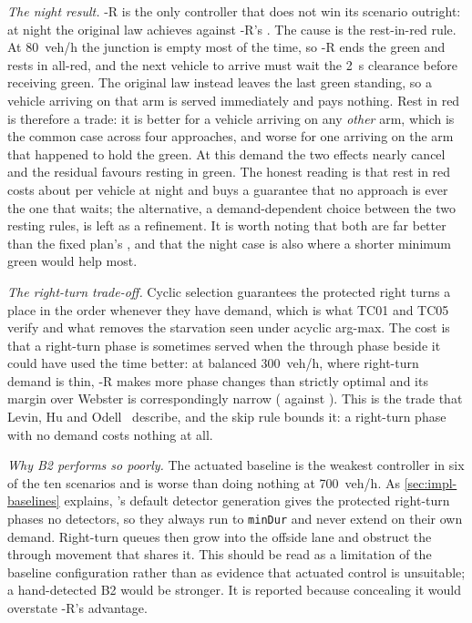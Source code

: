\textit{The night result.} \prism{}-R is the only controller that does not win its scenario outright: at
night the original law achieves  against \prism{}-R's . The cause is the rest-in-red
rule. At 80~veh/h the junction is empty most of the time, so \prism{}-R ends the green and rests in all-red,
and the next vehicle to arrive must wait the 2~s clearance before receiving green. The original law instead
leaves the last green standing, so a vehicle arriving on that arm is served immediately and pays nothing.
Rest in red is therefore a trade: it is better for a vehicle arriving on any \emph{other} arm, which is the
common case across four approaches, and worse for one arriving on the arm that happened to hold the green.
At this demand the two effects nearly cancel and the residual favours resting in green. The honest reading is
that rest in red costs about  per vehicle at night and buys a guarantee that no approach is ever
the one that waits; the alternative, a demand-dependent choice between the two resting rules, is left as a
refinement. It is worth noting that both are far better than the fixed plan's , and that the
night case is also where a shorter minimum green would help most.

\textit{The right-turn trade-off.} Cyclic selection guarantees the protected right turns a place in the
order whenever they have demand, which is what TC01 and TC05 verify and what removes the starvation seen
under acyclic arg-max. The cost is that a right-turn phase is sometimes served when the through phase beside
it could have used the time better: at balanced 300~veh/h, where right-turn demand is thin, \prism{}-R makes
more phase changes than strictly optimal and its margin over Webster is correspondingly narrow
( against ). This is the trade that Levin, Hu and Odell~\cite{levin2020cyclic} describe,
and the skip rule bounds it: a right-turn phase with no demand costs nothing at all.

\textit{Why B2 performs so poorly.} The actuated baseline is the weakest controller in six of the ten
scenarios and is worse than doing nothing at 700~veh/h. As \cref{sec:impl-baselines} explains, \sumo{}'s
default detector generation gives the protected right-turn phases no detectors, so they always run to
\texttt{minDur} and never extend on their own demand. Right-turn queues then grow into the offside lane and
obstruct the through movement that shares it. This should be read as a limitation of the baseline
configuration rather than as evidence that actuated control is unsuitable; a hand-detected B2 would be
stronger. It is reported because concealing it would overstate \prism{}-R's advantage.

